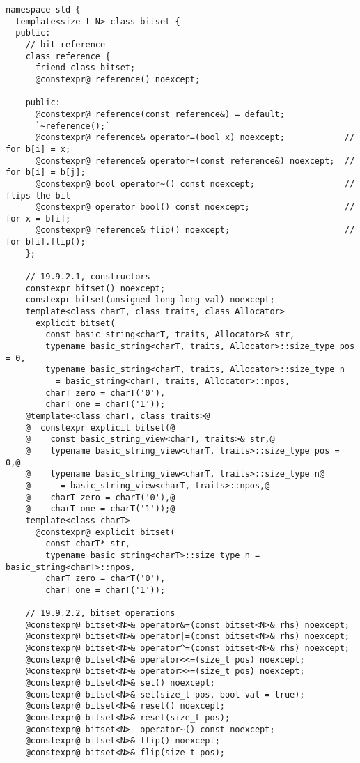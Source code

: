 \documentclass[ebook,11pt,article,a4paper]{memoir}
\begin{document}
\begin{lstlisting}[style=cppdiff]
namespace std {
  template<size_t N> class bitset {
  public:
    // bit reference
    class reference {
      friend class bitset;
      @constexpr@ reference() noexcept;

    public:
      @constexpr@ reference(const reference&) = default;
      `~reference();`
      @constexpr@ reference& operator=(bool x) noexcept;            // for b[i] = x;
      @constexpr@ reference& operator=(const reference&) noexcept;  // for b[i] = b[j];
      @constexpr@ bool operator~() const noexcept;                  // flips the bit
      @constexpr@ operator bool() const noexcept;                   // for x = b[i];
      @constexpr@ reference& flip() noexcept;                       // for b[i].flip();
    };

    // 19.9.2.1, constructors
    constexpr bitset() noexcept;
    constexpr bitset(unsigned long long val) noexcept;
    template<class charT, class traits, class Allocator>
      explicit bitset(
        const basic_string<charT, traits, Allocator>& str,
        typename basic_string<charT, traits, Allocator>::size_type pos = 0,
        typename basic_string<charT, traits, Allocator>::size_type n
          = basic_string<charT, traits, Allocator>::npos,
        charT zero = charT('0'),
        charT one = charT('1'));
    @template<class charT, class traits>@
    @  constexpr explicit bitset(@
    @    const basic_string_view<charT, traits>& str,@
    @    typename basic_string_view<charT, traits>::size_type pos = 0,@
    @    typename basic_string_view<charT, traits>::size_type n@
    @      = basic_string_view<charT, traits>::npos,@
    @    charT zero = charT('0'),@
    @    charT one = charT('1'));@
    template<class charT>
      @constexpr@ explicit bitset(
        const charT* str,
        typename basic_string<charT>::size_type n = basic_string<charT>::npos,
        charT zero = charT('0'),
        charT one = charT('1'));

    // 19.9.2.2, bitset operations
    @constexpr@ bitset<N>& operator&=(const bitset<N>& rhs) noexcept;
    @constexpr@ bitset<N>& operator|=(const bitset<N>& rhs) noexcept;
    @constexpr@ bitset<N>& operator^=(const bitset<N>& rhs) noexcept;
    @constexpr@ bitset<N>& operator<<=(size_t pos) noexcept;
    @constexpr@ bitset<N>& operator>>=(size_t pos) noexcept;
    @constexpr@ bitset<N>& set() noexcept;
    @constexpr@ bitset<N>& set(size_t pos, bool val = true);
    @constexpr@ bitset<N>& reset() noexcept;
    @constexpr@ bitset<N>& reset(size_t pos);
    @constexpr@ bitset<N>  operator~() const noexcept;
    @constexpr@ bitset<N>& flip() noexcept;
    @constexpr@ bitset<N>& flip(size_t pos);


\end{lstlisting}
\end{document}
